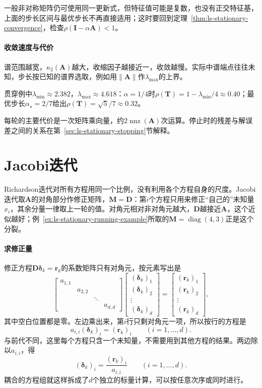 一般非对称矩阵仍可使用同一更新式，但特征值可能是复数，也没有正交特征基，上面的步长区间与最优步长不再直接适用；这时要回到定理~\ref{thm:ls-stationary-convergence}，检查$\rho(\bm I-\alpha\bm A)<1$。

\paragraph{收敛速度与代价}
谱范围越宽，$\kappa_2(\bm A)$越大，收缩因子越接近一，收敛越慢。实际中谱端点往往未知，步长按已知的谱界选取，例如用$\lVert\bm A\rVert$作$\lambda_{\max}$的上界。

贯穿例中$\lambda_{\min}\approx2.382$，$\lambda_{\max}\approx4.618$：$\alpha=1/4$时$\rho(\bm T)=1-\lambda_{\min}/4\approx0.40$；最优步长$\alpha_\star=2/7$给出$\rho(\bm T)=\sqrt5/7\approx0.32$。

每轮的主要代价是一次矩阵乘向量，约$2\operatorname{nnz}(\bm A)$次运算。停止时的残差与解误差之间的关系在第~\ref{sec:ls-stationary-stopping}节解释。

\section{Jacobi迭代}
\label{sec:ls-jacobi}

Richardson迭代对所有方程用同一个比例，没有利用各个方程自身的尺度。Jacobi迭代取$\bm A$的对角部分作修正矩阵，$\bm M=\bm D$：第$i$个方程只用来修正“自己的”未知量$x_i$，其余分量一律取上一轮的值。对角元相对非对角元越大，$\bm D$越接近$\bm A$，这个近似越好；例~\ref{ex:ls-stationary-running-example}所取的$\bm M=\operatorname{diag}(4,3)$正是这个分裂。

\paragraph{求修正量}
修正方程$\bm D\bm\delta_k=\bm r_k$的系数矩阵只有对角元，按元素写出是
\[
 \begin{bmatrix}a_{1,1}&&&\\&a_{2,2}&&\\&&\ddots&\\&&&a_{d,d}\end{bmatrix}
 \begin{bmatrix}(\bm\delta_k)_1\\(\bm\delta_k)_2\\\vdots\\(\bm\delta_k)_d\end{bmatrix}
 =\begin{bmatrix}(\bm r_k)_1\\(\bm r_k)_2\\\vdots\\(\bm r_k)_d\end{bmatrix},
\]
其中空白位置都是零。左边乘出来，第$i$行只剩对角元一项，所以按行的方程是
\[
 a_{i,i}(\bm\delta_k)_i=(\bm r_k)_i\qquad(i=1,\ldots,d).
\]
与前代不同，这里每个方程只含一个未知量，不需要用到其他方程的结果。两边除以$a_{i,i}$，得
\begin{equation}
 (\bm\delta_k)_i=\frac{(\bm r_k)_i}{a_{i,i}}\qquad(i=1,\ldots,d).
 \label{eq:ls-jacobi-correction}
\end{equation}
耦合的方程组就这样拆成了$d$个独立的标量计算，可以按任意次序或同时进行。


